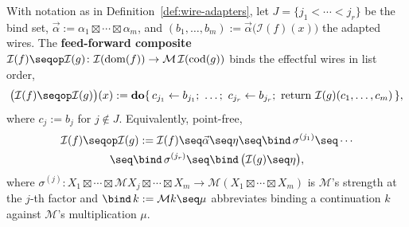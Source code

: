 \begin{definition}
\label{def:feed-forward}
\leanok
With notation as in Definition~\ref{def:wire-adapters}, let
$J = \{j_1 < \cdots < j_r\}$ be the bind set,
$\vec\alpha := \alpha_1 \boxtimes \cdots \boxtimes \alpha_m$, and
$(b_1,\ldots,b_m) := \vec\alpha\bigl(\mathcal I(f)(x)\bigr)$ the
adapted wires. The \textbf{feed-forward composite}
$\mathcal I(f) \seqop \mathcal I(g) \colon \mathcal I(\mathrm{dom}(f))
\to \mathcal M\,\mathcal I(\mathrm{cod}(g))$ binds the effectful wires
in list order,
\[
  \bigl(\mathcal I(f) \seqop \mathcal I(g)\bigr)(x) :=
  \Do\{\, c_{j_1} \leftarrow b_{j_1};\ \ldots;\ c_{j_r} \leftarrow b_{j_r};\
  \Ret\ \mathcal I(g)(c_1,\ldots,c_m) \,\},
\]
where $c_j := b_j$ for $j \notin J$. Equivalently, point-free,
\begin{multline*}
  \mathcal I(f) \seqop \mathcal I(g) := \mathcal I(f) \seq \vec\alpha
  \seq \eta \seq \bind\,\sigma^{(j_1)} \seq \cdots \\
  \seq \bind\,\sigma^{(j_r)} \seq \bind\,\bigl(\mathcal I(g) \seq \eta\bigr),
\end{multline*}
where
$\sigma^{(j)} \colon X_1 \boxtimes \cdots \boxtimes \mathcal M X_j \boxtimes
\cdots \boxtimes X_m \to \mathcal M(X_1 \boxtimes \cdots \boxtimes X_m)$ is
$\mathcal M$'s strength at the $j$-th factor and
$\bind\,k := \mathcal M k \seq \mu$ abbreviates binding a continuation
$k$ against $\mathcal M$'s multiplication $\mu$.
\end{definition}

